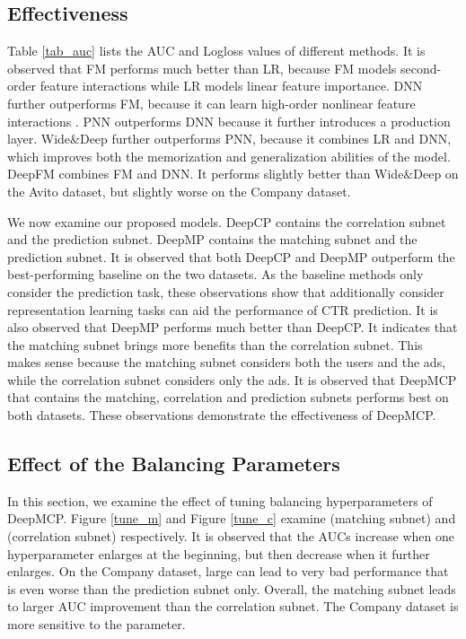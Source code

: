 \documentclass{article}
\begin{document}
\subsection{Effectiveness}
Table \ref{tab_auc} lists the AUC and Logloss values of different methods. It is observed that FM performs much better than LR, because FM models second-order feature interactions while LR models linear feature importance. DNN further outperforms FM, because it can learn high-order nonlinear feature interactions \cite{he2017neural}. PNN outperforms DNN because it further introduces a production layer. Wide\&Deep further outperforms PNN, because it combines LR and DNN, which improves both the memorization and generalization abilities of the model. DeepFM combines FM and DNN. It performs slightly better than Wide\&Deep on the Avito dataset, but slightly worse on the Company dataset.

We now examine our proposed models. DeepCP contains the correlation subnet and the prediction subnet. DeepMP contains the matching subnet and the prediction subnet.
It is observed that both DeepCP and DeepMP outperform the best-performing baseline on the two datasets. As the baseline methods only consider the prediction task, these observations show that additionally consider representation learning tasks can aid the performance of CTR prediction. It is also observed that DeepMP performs much better than DeepCP. It indicates that the matching subnet brings more benefits than the correlation subnet. This makes sense because the matching subnet considers both the users and the ads, while the correlation subnet considers only the ads.
It is observed that DeepMCP that contains the matching, correlation and prediction subnets performs best on both datasets.
These observations demonstrate the effectiveness of DeepMCP.

\subsection{Effect of the Balancing Parameters}
In this section, we examine the effect of tuning balancing hyperparameters of DeepMCP.
Figure \ref{tune_m} and Figure \ref{tune_c} examine  (matching subnet) and  (correlation subnet) respectively.
It is observed that the AUCs increase when one hyperparameter enlarges at the beginning, but then decrease when it further enlarges.
On the Company dataset, large  can lead to very bad performance that is even worse than the prediction subnet only.
Overall, the matching subnet leads to larger AUC improvement than the correlation subnet.
The Company dataset is more sensitive to the  parameter.
\end{document}
